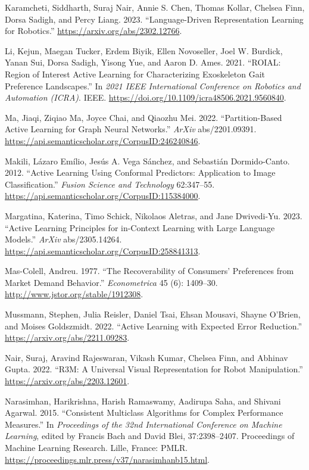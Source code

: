 \documentclass[
  letterpaper,
  numbers=noenddot,
  DIV=11]{scrreprt}
\newlength{\cslhangindent}
\newenvironment{CSLReferences}[2] %
 {\begin{list}{}{%
  \setlength{\itemindent}{0pt}
  \setlength{\leftmargin}{0pt}
  \setlength{\parsep}{0pt}
  \ifodd #1
   \setlength{\leftmargin}{\cslhangindent}
   \setlength{\itemindent}{-1\cslhangindent}
  \fi
  \setlength{\itemsep}{#2\baselineskip}}}
 {\end{list}}
\theoremstyle{definition}
\theoremstyle{plain}
\theoremstyle{plain}
\theoremstyle{remark}
\begin{document}
\begin{CSLReferences}{1}{0}
Karamcheti, Siddharth, Suraj Nair, Annie S. Chen, Thomas Kollar, Chelsea
Finn, Dorsa Sadigh, and Percy Liang. 2023. {``Language-Driven
Representation Learning for Robotics.''}
\url{https://arxiv.org/abs/2302.12766}.

Li, Kejun, Maegan Tucker, Erdem Biyik, Ellen Novoseller, Joel W.
Burdick, Yanan Sui, Dorsa Sadigh, Yisong Yue, and Aaron D. Ames. 2021.
{``ROIAL: Region of Interest Active Learning for Characterizing
Exoskeleton Gait Preference Landscapes.''} In \emph{2021 IEEE
International Conference on Robotics and Automation (ICRA)}. IEEE.
\url{https://doi.org/10.1109/icra48506.2021.9560840}.

Ma, Jiaqi, Ziqiao Ma, Joyce Chai, and Qiaozhu Mei. 2022.
{``Partition-Based Active Learning for Graph Neural Networks.''}
\emph{ArXiv} abs/2201.09391.
\url{https://api.semanticscholar.org/CorpusID:246240846}.

Makili, Lázaro Emílio, Jesús A. Vega Sánchez, and Sebastián
Dormido-Canto. 2012. {``Active Learning Using Conformal Predictors:
Application to Image Classification.''} \emph{Fusion Science and
Technology} 62:347--55.
\url{https://api.semanticscholar.org/CorpusID:115384000}.

Margatina, Katerina, Timo Schick, Nikolaos Aletras, and Jane Dwivedi-Yu.
2023. {``Active Learning Principles for in-Context Learning with Large
Language Models.''} \emph{ArXiv} abs/2305.14264.
\url{https://api.semanticscholar.org/CorpusID:258841313}.

Mas-Colell, Andreu. 1977. {``The Recoverability of Consumers'
Preferences from Market Demand Behavior.''} \emph{Econometrica} 45 (6):
1409--30. \url{http://www.jstor.org/stable/1912308}.

Mussmann, Stephen, Julia Reisler, Daniel Tsai, Ehsan Mousavi, Shayne
O'Brien, and Moises Goldszmidt. 2022. {``Active Learning with Expected
Error Reduction.''} \url{https://arxiv.org/abs/2211.09283}.

Nair, Suraj, Aravind Rajeswaran, Vikash Kumar, Chelsea Finn, and Abhinav
Gupta. 2022. {``R3M: A Universal Visual Representation for Robot
Manipulation.''} \url{https://arxiv.org/abs/2203.12601}.

Narasimhan, Harikrishna, Harish Ramaswamy, Aadirupa Saha, and Shivani
Agarwal. 2015. {``Consistent Multiclass Algorithms for Complex
Performance Measures.''} In \emph{Proceedings of the 32nd International
Conference on Machine Learning}, edited by Francis Bach and David Blei,
37:2398--2407. Proceedings of Machine Learning Research. Lille, France:
PMLR. \url{https://proceedings.mlr.press/v37/narasimhanb15.html}.


\end{CSLReferences}
\end{document}
